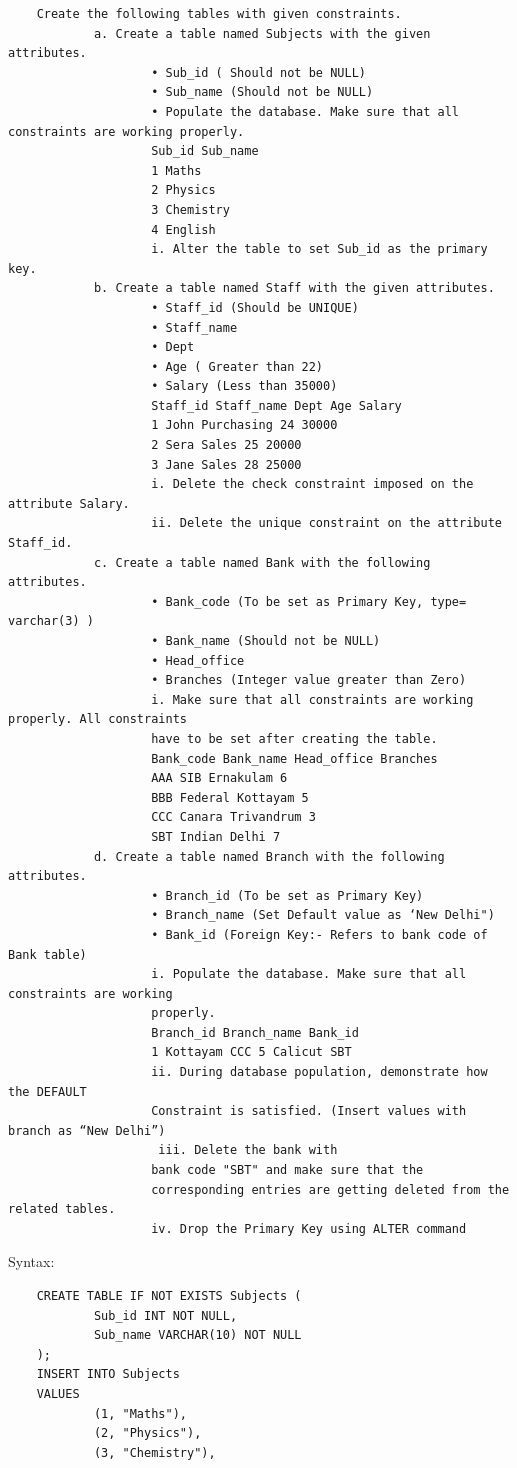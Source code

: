 \documentclass[13pt,oneside]{book}
\begin{document}
\begin{Itemize}
	\item
	\begin{verbatim}
	Create the following tables with given constraints. 
			a. Create a table named Subjects with the given attributes. 
					• Sub_id ( Should not be NULL) 
					• Sub_name (Should not be NULL) 
					• Populate the database. Make sure that all constraints are working properly. 
					Sub_id Sub_name 
					1 Maths 
					2 Physics 
					3 Chemistry 
					4 English 
					i. Alter the table to set Sub_id as the primary key. 
			b. Create a table named Staff with the given attributes. 
					• Staff_id (Should be UNIQUE) 
					• Staff_name 
					• Dept 
					• Age ( Greater than 22) 
					• Salary (Less than 35000) 
					Staff_id Staff_name Dept Age Salary 
					1 John Purchasing 24 30000 
					2 Sera Sales 25 20000 
					3 Jane Sales 28 25000 
					i. Delete the check constraint imposed on the attribute Salary. 
					ii. Delete the unique constraint on the attribute Staff_id. 
			c. Create a table named Bank with the following attributes. 
					• Bank_code (To be set as Primary Key, type= varchar(3) ) 
					• Bank_name (Should not be NULL) 
					• Head_office 
					• Branches (Integer value greater than Zero) 
					i. Make sure that all constraints are working properly. All constraints 
					have to be set after creating the table. 
					Bank_code Bank_name Head_office Branches 
					AAA SIB Ernakulam 6 
					BBB Federal Kottayam 5 
					CCC Canara Trivandrum 3 
					SBT Indian Delhi 7 
			d. Create a table named Branch with the following attributes. 
					• Branch_id (To be set as Primary Key) 
					• Branch_name (Set Default value as ‘New Delhi") 
					• Bank_id (Foreign Key:- Refers to bank code of Bank table) 
					i. Populate the database. Make sure that all constraints are working 
					properly. 
					Branch_id Branch_name Bank_id 
					1 Kottayam CCC 5 Calicut SBT 
					ii. During database population, demonstrate how the DEFAULT 
					Constraint is satisfied. (Insert values with branch as “New Delhi”)
					 iii. Delete the bank with 
					bank code "SBT" and make sure that the 
					corresponding entries are getting deleted from the related tables. 
					iv. Drop the Primary Key using ALTER command 
	\end{verbatim}
Syntax: 	
\begin{verbatim}
	CREATE TABLE IF NOT EXISTS Subjects (
			Sub_id INT NOT NULL,
			Sub_name VARCHAR(10) NOT NULL
	);
	INSERT INTO Subjects
	VALUES
			(1, "Maths"),
			(2, "Physics"),
			(3, "Chemistry"),

\end{verbatim}
\end{Itemize}
\end{document}
